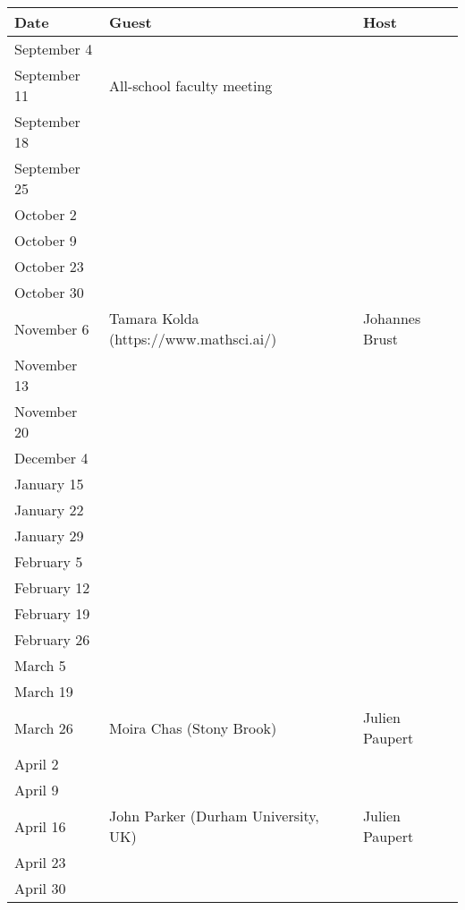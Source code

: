 \documentclass[11pt]{article}
\begin{document}
\begin{table}[htp]
\caption{}
\begin{center}
\begin{tabular}{|l|l|l|}
\hline
Date & Guest & Host\\
\hline
September 4 & & \\
September 11 & All-school faculty meeting & \\
September 18 & & \\
September 25 & & \\
October 2 & & \\
October 9 & & \\
October 23 & & \\
October 30 & & \\
November 6 & Tamara Kolda (https://www.mathsci.ai/) & Johannes Brust\\
November 13 & & \\
November 20 & & \\
December 4 & & \\
January 15 & & \\
January 22 & & \\
January 29 & & \\
February 5 & & \\
February 12 & & \\
February 19 & & \\
February 26  & & \\
March 5 & & \\
March 19 & & \\
March 26 & Moira Chas (Stony Brook) & Julien Paupert \\
April 2 & & \\
April 9 & & \\
April 16 & John Parker (Durham University, UK)& Julien Paupert \\
April 23 & & \\
April 30 & & \\
\hline
\end{tabular}
\end{center}
\label{default}
\end{table}%
\end{document}
